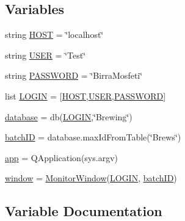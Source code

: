\subsection*{Variables}
\begin{DoxyCompactItemize}
\item 
string \mbox{\hyperlink{namespaceboil_mash_monitor_aaf393e03ba47fb4d4cd4da6a0b885b6f}{H\+O\+ST}} = \char`\"{}localhost\char`\"{}
\item 
string \mbox{\hyperlink{namespaceboil_mash_monitor_aef5bd2fb4e6848fe82bf144234159d3a}{U\+S\+ER}} = \char`\"{}Test\char`\"{}
\item 
string \mbox{\hyperlink{namespaceboil_mash_monitor_a58770b0ee81ebb75662253e7c03d40d9}{P\+A\+S\+S\+W\+O\+RD}} = \char`\"{}Birra\+Mosfeti\char`\"{}
\item 
list \mbox{\hyperlink{namespaceboil_mash_monitor_a8408c26ef74bdfc75af04aba577b439d}{L\+O\+G\+IN}} = \mbox{[}\mbox{\hyperlink{namespaceboil_mash_monitor_aaf393e03ba47fb4d4cd4da6a0b885b6f}{H\+O\+ST}},\mbox{\hyperlink{namespaceboil_mash_monitor_aef5bd2fb4e6848fe82bf144234159d3a}{U\+S\+ER}},\mbox{\hyperlink{namespaceboil_mash_monitor_a58770b0ee81ebb75662253e7c03d40d9}{P\+A\+S\+S\+W\+O\+RD}}\mbox{]}
\item 
\mbox{\hyperlink{namespaceboil_mash_monitor_a4ef2a42c3df0b871a7b50b94074ff6a9}{database}} = db(\mbox{\hyperlink{namespaceboil_mash_monitor_a8408c26ef74bdfc75af04aba577b439d}{L\+O\+G\+IN}},\char`\"{}Brewing\char`\"{})
\item 
\mbox{\hyperlink{namespaceboil_mash_monitor_a92c0da44566d11f8b05a97da7dd7c72d}{batch\+ID}} = database.\+max\+Id\+From\+Table(\char`\"{}Brews\char`\"{})
\item 
\mbox{\hyperlink{namespaceboil_mash_monitor_a8521f8e50f37d60323e26f902bf40744}{app}} = Q\+Application(sys.\+argv)
\item 
\mbox{\hyperlink{namespaceboil_mash_monitor_a153037ae99a581f857b26b7ea6a9d53e}{window}} = \mbox{\hyperlink{classboil_mash_monitor_1_1_monitor_window}{Monitor\+Window}}(\mbox{\hyperlink{namespaceboil_mash_monitor_a8408c26ef74bdfc75af04aba577b439d}{L\+O\+G\+IN}}, \mbox{\hyperlink{namespaceboil_mash_monitor_a92c0da44566d11f8b05a97da7dd7c72d}{batch\+ID}})
\end{DoxyCompactItemize}


\subsection{Variable Documentation}
\mbox{\label{namespaceboil_mash_monitor_a8521f8e50f37d60323e26f902bf40744}} 
